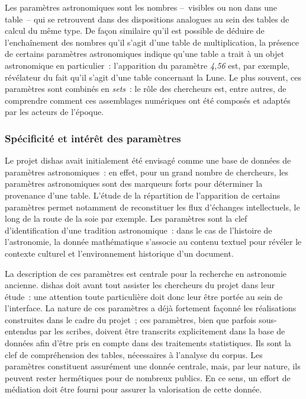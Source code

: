 \documentclass[a4paper,12pt,twoside]{book}
\newcommand{\eng}{\emph}
\newcommand{\dishas}{\gls{dishas}\xspace}
\begin{document}
Les paramètres astronomiques sont les nombres –~visibles ou non dans une table~– qui se retrouvent dans des dispositions analogues au sein des tables de calcul du même type. De façon similaire qu'il est possible de déduire de l'enchaînement des nombres qu'il s'agit d'une table de multiplication, la présence de certains paramètres astronomiques indique qu'une table a trait à un objet astronomique en particulier~: l'apparition du paramètre \emph{4,56} est, par exemple, révélateur du fait qu'il s'agit d'une table concernant la Lune. Le plus souvent, ces paramètres sont combinés en \eng{sets}~: le rôle des chercheurs est, entre autres, de comprendre comment ces assemblages numériques ont été composés et adaptés par les acteurs de l'époque.

			\subsubsection{Spécificité et intérêt des paramètres}
Le projet \dishas avait initialement été envisagé comme une base de données de paramètres astronomiques~: en effet, pour un grand nombre de chercheurs, les paramètres astronomiques sont des marqueurs forts pour déterminer la provenance d’une table. L’étude de la répartition de l’apparition de certains paramètres permet notamment de reconstituer les flux d’échanges intellectuels, le long de la route de la soie par exemple. Les paramètres sont la clef d'identification d'une tradition astronomique~: dans le cas de l'histoire de l'astronomie, la donnée mathématique s'associe au contenu textuel pour révéler le contexte culturel et l'environnement historique d'un document.

La description de ces paramètres est centrale pour la recherche en astronomie ancienne. \dishas doit avant tout assister les chercheurs du projet dans leur étude~: une attention toute particulière doit donc leur être portée au sein de l'interface. La nature de ces paramètres a déjà fortement façonné les réalisations construites dans le cadre du projet~; ces paramètres, bien que parfois sous-entendus par les scribes, doivent être transcrits explicitement dans la base de données afin d'être pris en compte dans des traitements statistiques. Ils sont la clef de compréhension des tables, nécessaires à l'analyse du corpus. Les paramètres constituent assurément une donnée centrale, mais, par leur nature, ils peuvent rester hermétiques pour de nombreux publics. En ce sens, un effort de médiation doit être fourni pour assurer la valorisation de cette donnée.
\end{document}
